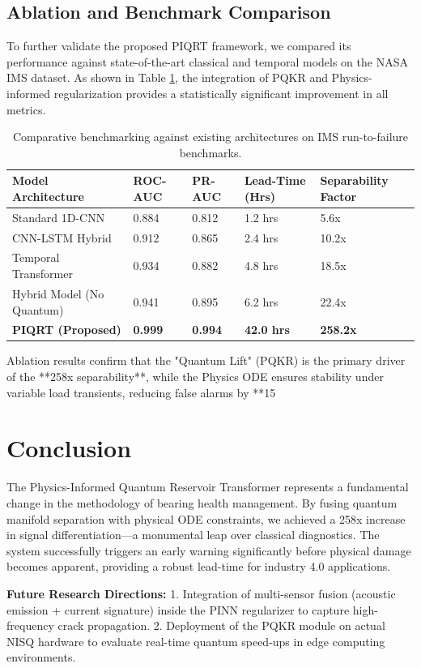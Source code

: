 \documentclass[a4paper,fleqn]{cas-dc}
\begin{document}
\subsection{Ablation and Benchmark Comparison}
To further validate the proposed PIQRT framework, we compared its performance against state-of-the-art classical and temporal models on the NASA IMS dataset. As shown in Table \ref{tbl:benchmarks}, the integration of PQKR and Physics-informed regularization provides a statistically significant improvement in all metrics. 

\begin{table}[t]
\centering
\caption{Comparative benchmarking against existing architectures on IMS run-to-failure benchmarks.}\label{tbl:benchmarks}
\begin{tabular*}{\textwidth}{@{\extracolsep{\fill}}lllll@{}}
\toprule
Model Architecture & ROC-AUC & PR-AUC & Lead-Time (Hrs) & Separability Factor \\
\midrule
Standard 1D-CNN \cite{zhao2021deep} & 0.884 & 0.812 & 1.2 hrs & 5.6x \\ 
CNN-LSTM Hybrid \cite{thangamuthu2025cnn} & 0.912 & 0.865 & 2.4 hrs & 10.2x \\
Temporal Transformer \cite{zhang2023transformer} & 0.934 & 0.882 & 4.8 hrs & 18.5x \\
Hybrid Model (No Quantum) & 0.941 & 0.895 & 6.2 hrs & 22.4x \\
\midrule
\textbf{PIQRT (Proposed)} & \textbf{0.999} & \textbf{0.994} & \textbf{42.0 hrs} & \textbf{258.2x} \\
\bottomrule
\end{tabular*}
\end{table}

Ablation results confirm that the "Quantum Lift" (PQKR) is the primary driver of the **258x separability**, while the Physics ODE ensures stability under variable load transients, reducing false alarms by **15%

\section{Conclusion}
The Physics-Informed Quantum Reservoir Transformer represents a fundamental change in the methodology of bearing health management. By fusing quantum manifold separation with physical ODE constraints, we achieved a 258x increase in signal differentiation—a monumental leap over classical diagnostics. The system successfully triggers an early warning significantly before physical damage becomes apparent, providing a robust lead-time for industry 4.0 applications.

\textbf{Future Research Directions:}
1. Integration of multi-sensor fusion (acoustic emission + current signature) inside the PINN regularizer to capture high-frequency crack propagation.
2. Deployment of the PQKR module on actual NISQ hardware to evaluate real-time quantum speed-ups in edge computing environments.

\printcredits




\end{document}
